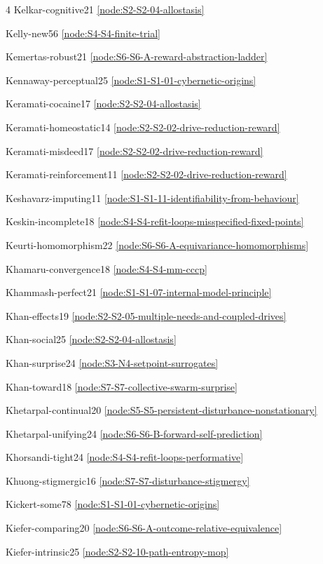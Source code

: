\documentclass[10pt]{article}
\begin{document}
{\begin{multicols}{4}
Kelkar-cognitive21 \hfill \ref{node:S2-S2-04-allostasis}\par
Kelly-new56 \hfill \ref{node:S4-S4-finite-trial}\par
Kemertas-robust21 \hfill \ref{node:S6-S6-A-reward-abstraction-ladder}\par
Kennaway-perceptual25 \hfill \ref{node:S1-S1-01-cybernetic-origins}\par
Keramati-cocaine17 \hfill \ref{node:S2-S2-04-allostasis}\par
Keramati-homeostatic14 \hfill \ref{node:S2-S2-02-drive-reduction-reward}\par
Keramati-misdeed17 \hfill \ref{node:S2-S2-02-drive-reduction-reward}\par
Keramati-reinforcement11 \hfill \ref{node:S2-S2-02-drive-reduction-reward}\par
Keshavarz-imputing11 \hfill \ref{node:S1-S1-11-identifiability-from-behaviour}\par
Keskin-incomplete18 \hfill \ref{node:S4-S4-refit-loops-misspecified-fixed-points}\par
Keurti-homomorphism22 \hfill \ref{node:S6-S6-A-equivariance-homomorphisms}\par
Khamaru-convergence18 \hfill \ref{node:S4-S4-mm-cccp}\par
Khammash-perfect21 \hfill \ref{node:S1-S1-07-internal-model-principle}\par
Khan-effects19 \hfill \ref{node:S2-S2-05-multiple-needs-and-coupled-drives}\par
Khan-social25 \hfill \ref{node:S2-S2-04-allostasis}\par
Khan-surprise24 \hfill \ref{node:S3-N4-setpoint-surrogates}\par
Khan-toward18 \hfill \ref{node:S7-S7-collective-swarm-surprise}\par
Khetarpal-continual20 \hfill \ref{node:S5-S5-persistent-disturbance-nonstationary}\par
Khetarpal-unifying24 \hfill \ref{node:S6-S6-B-forward-self-prediction}\par
Khorsandi-tight24 \hfill \ref{node:S4-S4-refit-loops-performative}\par
Khuong-stigmergic16 \hfill \ref{node:S7-S7-disturbance-stigmergy}\par
Kickert-some78 \hfill \ref{node:S1-S1-01-cybernetic-origins}\par
Kiefer-comparing20 \hfill \ref{node:S6-S6-A-outcome-relative-equivalence}\par
Kiefer-intrinsic25 \hfill \ref{node:S2-S2-10-path-entropy-mop}\par

\end{multicols}}
\end{document}
